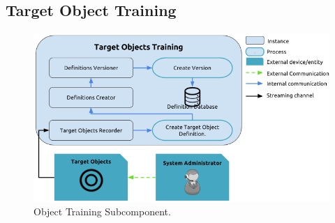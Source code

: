 %
%
%
%
%

\subsection{Target Object Training}
%
%
%
%
%
\begin{figure}[htb!]
  \centering
  \includegraphics[scale=0.65]{Imagens/cap4_objtraining.png}
  \caption{Object Training Subcomponent.}
  \label{fig:objt}
\end{figure}
